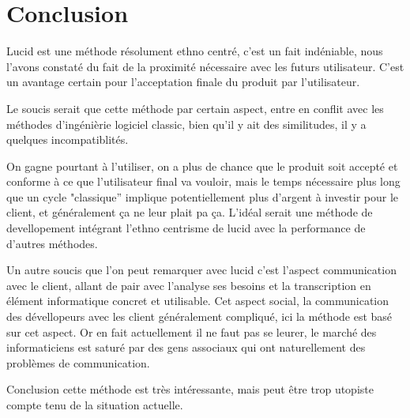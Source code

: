 \documentclass[11pt,a4paper]{article}
\begin{document}
\section{Conclusion}

Lucid est une méthode résolument ethno centré, c'est un fait indéniable, nous l'avons constaté
du fait de la proximité nécessaire avec les futurs utilisateur. C'est un avantage certain pour 
l'acceptation finale du produit par l'utilisateur. 

Le soucis serait que cette méthode par certain aspect, entre en conflit avec les méthodes
d'ingénièrie logiciel classic, bien qu'il y ait des similitudes, il y a quelques incompatiblités.

On gagne pourtant à l'utiliser, on a  plus de chance que le produit soit accepté et
conforme à ce que l'utilisateur final va vouloir, mais le temps nécessaire plus
long que un cycle "classique'' implique potentiellement plus d'argent à investir
pour le client, et généralement ça ne leur plait pa ça. L'idéal serait une méthode de devellopement 
intégrant l'ethno centrisme de lucid avec la performance de d'autres méthodes.

Un autre soucis que l'on peut remarquer avec lucid c'est l'aspect communication avec le client,
allant de pair avec l'analyse ses besoins et la transcription en élément informatique concret et utilisable.
Cet aspect social, la communication des dévellopeurs avec les client généralement compliqué, ici la méthode 
est basé sur cet aspect. Or en fait actuellement il ne faut pas se leurer, le marché des informaticiens
est saturé par des gens associaux qui ont naturellement des problèmes de communication.

Conclusion cette méthode est très intéressante, mais peut être trop utopiste compte tenu 
de la situation actuelle.

  
  
\end{document}
